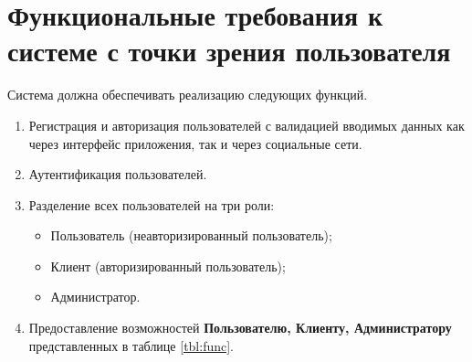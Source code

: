 \section*{Функциональные требования к системе с точки зрения пользователя}
Система должна обеспечивать реализацию следующих функций.
\begin{enumerate}
	\item Регистрация и авторизация пользователей с валидацией вводимых данных как через интерфейс приложения, так и через	социальные сети.
	
	\item Аутентификация пользователей.
	
	\item Разделение всех пользователей на три роли:
	\begin{itemize}
		\item Пользователь (неавторизированный пользователь);
		
		\item Клиент (авторизированный пользователь);
		
		\item Администратор.
	\end{itemize}
	
	\item Предоставление возможностей \textbf{Пользователю, Клиенту, Администратору} представленных в таблице \ref{tbl:func}.
\end{enumerate}

